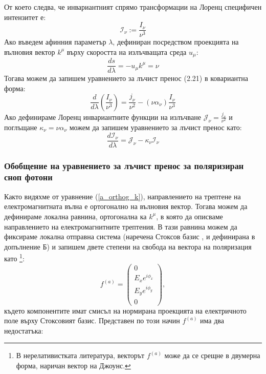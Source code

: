 От което следва, че инвариантният спрямо трансформации на Лоренц специфичен интензитет е:
\begin{equation}
	\mathcal{I}_\nu := \frac{I_\nu}{\nu^3}
\end{equation}
Ако въведем афинния параметър $\lambda$, дефиниран посредством проекцията на вълновия вектор $k^\mu$ върху скоростта на излъчващата среда $u_\mu$:
\begin{equation}
	\frac{ds}{d\lambda} = -u_\mu k^\mu = \nu
\end{equation}
Тогава можем да запишем уравнението за лъчист пренос (2.21) в ковариантна форма:
\begin{equation}
	\frac{d}{d\lambda}\left(\frac{I_\nu}{\nu^3}\right) = \frac{j_\nu}{\nu^2} - (\nu\alpha_\nu)\frac{I_\nu}{\nu^3}
\end{equation}
Ако дефинираме Лоренц инвариантните функции на излъчване $\mathcal{J}_\nu = \frac{j_\nu}{\nu^2}$ и поглъщане $\kappa_\nu = \nu\alpha_\nu$ можем да запишем уравнението за лъчист пренос като:
\begin{equation}
	\frac{d\mathcal{I}_\nu}{d\lambda} = \mathcal{J}_\nu - \kappa_\nu\mathcal{I}_\nu
\end{equation}
\subsubsection{Обобщение на уравнението за лъчист пренос за поляризиран сноп фотони}

Както видяхме от уравнение (\ref{a_orthog_k}), направлението на трептене на електромагнитната вълна е ортогонално на вълновия вектор. Тогава можем да дефинираме локална равнина, ортогонална ка $k^\mu$, в която да описваме направлението на електромагнитните трептения. В тази равнина можем да фиксираме локална отправна система (наречена Стоксов базис \cite{Bronzwaer2020}\cite{Ipole_Code}, и дефинирана в допълнение Б) и запишем двете степени на свобода на вектора на поляризация като \footnote{В нерелативистката литература, векторът $f^{(a)}$ може да се срещне в двумерна форма, наричан вектор на Джоунс.}:
\begin{equation}
f^{(a)} = \begin{pmatrix}
			0 \\
			E_{x} e^{i\phi_{x}} \\
			E_{y} e^{i\phi_{y}} \\
			0
	\end{pmatrix},
\end{equation}
където компонентите имат смисъл на нормирана проекцията на електричното поле върху Стоксовият базис. Представен по този начин $f^{(a)}$ има два недостатъка:\\

